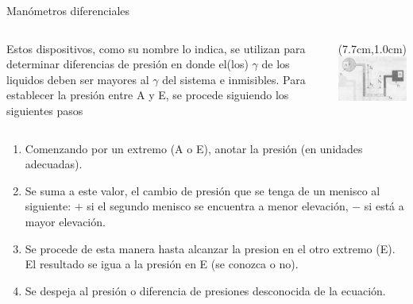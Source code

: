 \documentclass [xcolor=svgnames, t] {beamer}
\begin{document}
\begin{frame}{Man\'ometros diferenciales}
\vspace{-0.5cm}
\begin{block}{}
\begin{columns}
Estos dispositivos, como su nombre lo indica, se utilizan para determinar diferencias de presi\'on en donde el(los) $\gamma$ de los liquidos deben ser mayores al $\gamma$ del sistema e inmisibles. Para establecer la presi\'on entre A y E, se procede siguiendo los siguientes pasos
\begin{textblock*}{4.5cm}(7.7cm,1.0cm) %
\includegraphics[width=\textwidth]{manome2}
\end{textblock*}
\end{columns}
\end{block}
\begin{enumerate}
\item Comenzando por un extremo (A o E), anotar la presi\'on (en unidades adecuadas).
\item Se suma a este valor, el cambio de presi\'on que se tenga de un menisco al siguiente: $+$ si el segundo menisco se encuentra a menor elevaci\'on, $-$ si est\'a a mayor elevaci\'on.
\item Se procede de esta manera hasta alcanzar la presion en el otro extremo (E). El resultado se igua a la presi\'on en E (se conozca o no).
\item Se despeja al presi\'on o diferencia de presiones desconocida de la ecuaci\'on. 
\end{enumerate}
\end{frame}
\end{document}
